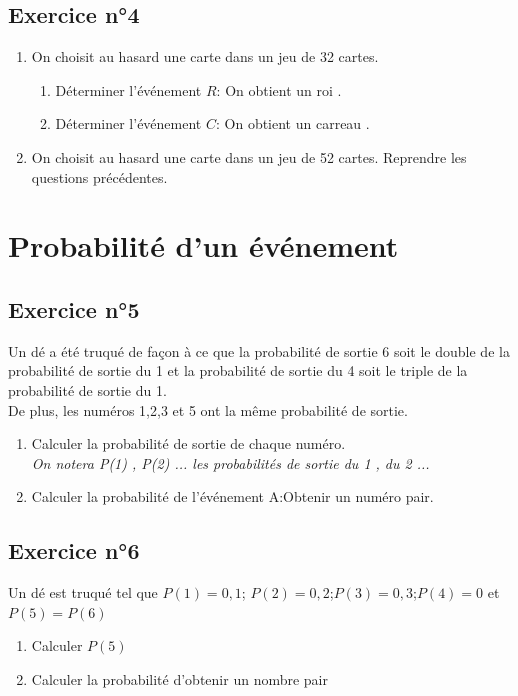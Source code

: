 \documentclass[12pt,a4paper]{article}
\begin{document}
\subsection*{Exercice n°4}

\begin{enumerate}
    \item On choisit au hasard une carte dans un jeu de 32 cartes.
    \begin{enumerate}
        \item Déterminer l'événement $R$: \og On obtient un roi \fg{}.
        \item Déterminer l'événement $C$: \og On obtient un carreau \fg{}.
    \end{enumerate}
    \item On choisit au hasard une carte dans un jeu de 52 cartes. Reprendre les questions précédentes.
\end{enumerate}

\section{Probabilité d'un événement}

\subsection*{Exercice n°5}

Un dé a été truqué de façon à ce que la probabilité de sortie 6 soit le double de la probabilité de sortie du 1 et la probabilité de sortie du 4 soit le triple de la probabilité de sortie du 1.\\
De plus, les numéros 1,2,3 et 5 ont la même probabilité de sortie.

\begin{enumerate}
    \item Calculer la probabilité de sortie de chaque numéro.\\ \textit{On notera P(1) , P(2) ... les probabilités de sortie du 1 , du 2 ...}
    \item Calculer la probabilité de l'événement A:\og Obtenir un numéro pair\fg{}.
\end{enumerate}

\subsection*{Exercice n°6} 
Un dé est truqué tel que $P(1)=0,1$; $P(2)=0,2$;$P(3)=0,3$;$P(4)=0$ et $P(5)=P(6)$
\begin{enumerate}
    \item Calculer $P(5)$
    \item Calculer la probabilité d'obtenir un nombre pair
\end{enumerate}
\end{document}
